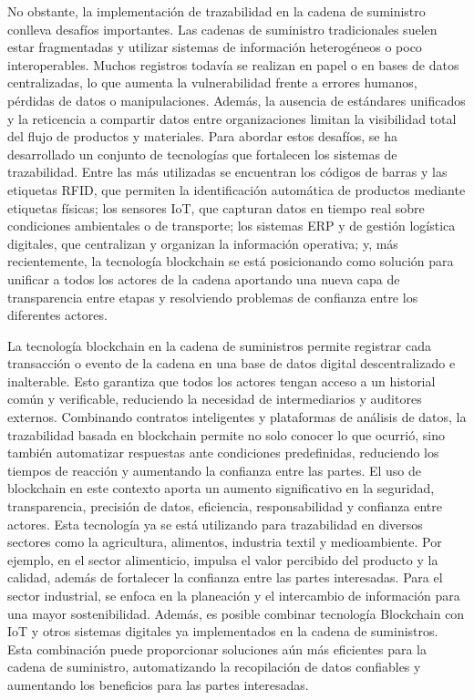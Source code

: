 No obstante, la implementación de trazabilidad en la cadena de suministro conlleva desafíos importantes. Las cadenas de suministro tradicionales suelen estar fragmentadas y utilizar sistemas de información heterogéneos o poco interoperables. Muchos registros todavía se realizan en papel o en bases de datos centralizadas, lo que aumenta la vulnerabilidad frente a errores humanos, pérdidas de datos o manipulaciones. Además, la ausencia de estándares unificados y la reticencia a compartir datos entre organizaciones limitan la visibilidad total del flujo de productos y materiales. Para abordar estos desafíos, se ha desarrollado un conjunto de tecnologías que fortalecen los sistemas de trazabilidad. Entre las más utilizadas se encuentran los códigos de barras y las etiquetas RFID, que permiten la identificación automática de productos mediante etiquetas físicas; los sensores IoT, que capturan datos en tiempo real sobre condiciones ambientales o de transporte; los sistemas ERP y de gestión logística digitales, que centralizan y organizan la información operativa; y, más recientemente, la tecnología blockchain se está posicionando como solución para unificar a todos los actores de la cadena aportando una nueva capa de transparencia entre etapas y resolviendo problemas de confianza entre los diferentes actores.

La tecnología blockchain en la cadena de suministros permite registrar cada transacción o evento de la cadena en una base de datos digital descentralizado e inalterable. Esto garantiza que todos los actores tengan acceso a un historial común y verificable, reduciendo la necesidad de intermediarios y auditores externos. Combinando contratos inteligentes y plataformas de análisis de datos, la trazabilidad basada en blockchain permite no solo conocer lo que ocurrió, sino también automatizar respuestas ante condiciones predefinidas, reduciendo los tiempos de reacción y aumentando la confianza entre las partes. El uso de blockchain en este contexto aporta un aumento significativo en la seguridad, transparencia, precisión de datos, eficiencia, responsabilidad y confianza entre actores. Esta tecnología ya se está utilizando para trazabilidad en diversos sectores como la agricultura, alimentos, industria textil y medioambiente. Por ejemplo, en el sector alimenticio, impulsa el valor percibido del producto y la calidad, además de fortalecer la confianza entre las partes interesadas. Para el sector industrial, se enfoca en la planeación y el intercambio de información para una mayor sostenibilidad. Además, es posible combinar tecnología Blockchain con IoT y otros sistemas digitales ya implementados en la cadena de suministros. Esta combinación puede proporcionar soluciones aún más eficientes para la cadena de suministro, automatizando la recopilación de datos confiables y aumentando los beneficios para las partes interesadas.


